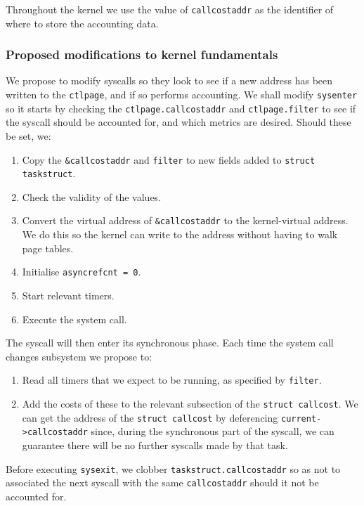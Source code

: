 \documentclass[12pt]{article}
\def\_{\textunderscore\-}
\begin{document}
Throughout the kernel we use the value of \texttt{call\_cost\_addr} as the identifier of where to store the accounting data.

  \subsubsection{Proposed modifications to kernel fundamentals}

We propose to modify syscalls  so they look to see if a new address has been written to the \texttt{ctl\_page}, and if so performs accounting.
 We shall modify \texttt{sysenter} so it starts by checking the \texttt{ctl\_page.call\_cost\_addr} and \texttt{ctl\_page.filter} to see if the syscall should be accounted for, and which metrics are desired. Should these be set, we:
  \begin{enumerate}
  \item Copy the \texttt{\&call\_cost\_addr} and \texttt{filter} to new fields added to \texttt{struct task\_struct}.
  \item Check the validity of the values.
  \item Convert the virtual address of \texttt{\&call\_cost\_addr} to the kernel-virtual address. We do this so the kernel can write to the address without having to walk page tables.
  \item Initialise \texttt{async\_ref\_cnt = 0}.
  \item Start relevant timers.
  \item Execute the system call.
  \end{enumerate}

  The syscall will then enter its synchronous phase. Each time the system call changes subsystem we propose to:
  \begin{enumerate}
  \item Read all timers that we expect to be running, as specified by \texttt{filter}.
  \item Add the costs of these to the relevant subsection of the \texttt{struct call\_cost}. We can get the address of the \texttt{struct call\_cost} by deferencing \texttt{current->call\_cost\_addr} since, during the synchronous part of the syscall, we can guarantee there will be no further syscalls made by that task.
  \end{enumerate}

  Before executing \texttt{sysexit}, we clobber \texttt{task\_struct.call\_cost\_addr} so as not to associated the next syscall with the same \texttt{call\_cost\_addr} should it not be accounted for.
\end{document}

